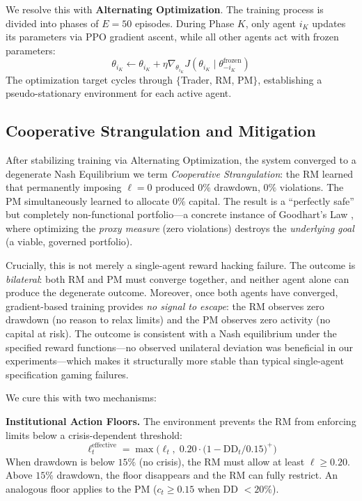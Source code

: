\documentclass[11pt]{article}
\begin{document}
We resolve this with \textbf{Alternating Optimization}. The training process is divided into phases of $E = 50$ episodes. During Phase $K$, only agent $i_K$ updates its parameters via PPO gradient ascent, while all other agents act with frozen parameters:
\begin{equation}
    \theta_{i_K} \leftarrow \theta_{i_K} + \eta \nabla_{\theta_{i_K}} J(\theta_{i_K} \mid \theta_{-i_K}^{\text{frozen}})
\end{equation}
The optimization target cycles through $\{$Trader, RM, PM$\}$, establishing a pseudo-stationary environment for each active agent.

\subsection{Cooperative Strangulation and Mitigation}
\label{sec:strangulation}
After stabilizing training via Alternating Optimization, the system converged to a degenerate Nash Equilibrium we term \emph{Cooperative Strangulation}: the RM learned that permanently imposing $\ell = 0$ produced $0\%$ drawdown, $0\%$ violations. The PM simultaneously learned to allocate $0\%$ capital. The result is a ``perfectly safe'' but completely non-functional portfolio---a concrete instance of Goodhart's Law \cite{krakovna2020avoiding}, where optimizing the \emph{proxy measure} (zero violations) destroys the \emph{underlying goal} (a viable, governed portfolio).

Crucially, this is not merely a single-agent reward hacking failure. The outcome is \emph{bilateral}: both RM and PM must converge together, and neither agent alone can produce the degenerate outcome. Moreover, once both agents have converged, gradient-based training provides \emph{no signal to escape}: the RM observes zero drawdown (no reason to relax limits) and the PM observes zero activity (no capital at risk). The outcome is consistent with a Nash equilibrium under the specified reward functions---no observed unilateral deviation was beneficial in our experiments---which makes it structurally more stable than typical single-agent specification gaming failures.

We cure this with two mechanisms:

\textbf{Institutional Action Floors.} The environment prevents the RM from enforcing limits below a crisis-dependent threshold:
\begin{equation}
    \ell_t^{\text{effective}} = \max\!\Big(\ell_t, \; 0.20 \cdot \big(1 - \text{DD}_t / 0.15\big)^+\Big)
\end{equation}
When drawdown is below $15\%$ (no crisis), the RM must allow at least $\ell \geq 0.20$. Above $15\%$ drawdown, the floor disappears and the RM can fully restrict. An analogous floor applies to the PM ($c_t \geq 0.15$ when DD $< 20\%$).
\end{document}
